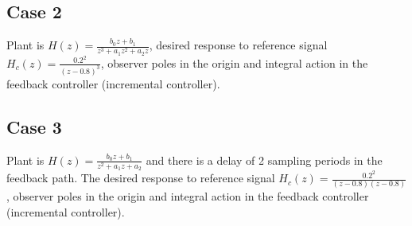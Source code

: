 \documentclass[letterpaper,fleqn]{scrartcl}
\begin{document}
\vspace*{27mm}

\subsection*{Case 2}
\label{sec-3-2}
Plant is \(H(z) = \frac{b_0z+b_1}{z^3  + a_1z^2 + a_2z}\),  desired response to reference signal \(H_c(z) = \frac{0.2^2}{(z-0.8)^3}\), observer poles in the origin and integral action in the feedback controller (incremental controller).


\vspace*{27mm}


\subsection*{Case 3}
\label{sec-3-3}
Plant is \(H(z) = \frac{b_0z+b_1}{z^2  + a_1z + a_2}\) and there is a delay of 2 sampling periods in the feedback path. The desired response to reference signal \(H_c(z) = \frac{0.2^2}{(z-0.8)(z-0.8)}\), observer poles in the origin and integral action in the feedback controller (incremental controller).
\end{document}
